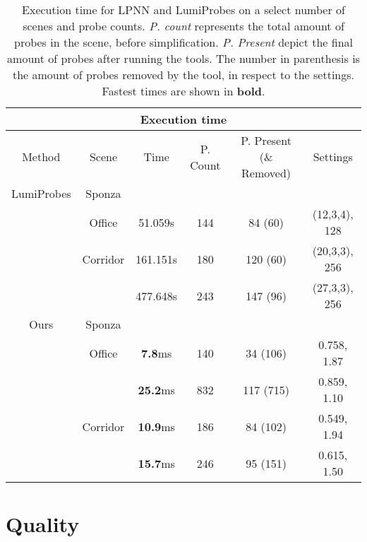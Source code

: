 \begin{table}
	\centering
\begin{tabular}{ |c||c|c|c|c|c|  }
	\hline
	\multicolumn{6}{|c|}{Execution time} \\
	\hline
	Method & Scene & Time & P. Count & P. Present (\& Removed) & Settings\\
	\hline
	LumiProbes & Sponza   &          &     &      &      \\
	\cline{2-6}
	           & Office   & 51.059s  & 144 & 84 (60)  & (12,3,4), 128\\
	\cline{2-6}
	           & Corridor & 161.151s & 180 & 120 (60) & (20,3,3), 256\\
	           &          & 477.648s & 243 & 147 (96) & (27,3,3), 256\\
	\hline
	\hline
	Ours       & Sponza    &       &     &           &             \\
	\cline{2-6}
			   & Office   & \textbf{7.8}ms  & 140 & 34 (106)  &  0.758, 1.87 \\
               &          & \textbf{25.2}ms & 832 & 117 (715) &  0.859, 1.10 \\
    \cline{2-6}
    		   & Corridor & \textbf{10.9}ms & 186 & 84 (102)  & 0.549, 1.94 \\
               &          & \textbf{15.7}ms & 246 & 95 (151)  & 0.615, 1.50 \\
               
	\hline
\end{tabular}
\caption{Execution time for LPNN and LumiProbes on a select number of scenes and probe counts. \textit{P. count} represents the total amount of probes in the scene, before simplification. \textit{P. Present} depict the final amount of probes after running the tools. The number in parenthesis is the amount of probes removed by the tool, in respect to the settings. Fastest times are shown in \textbf{bold}.}
\label{table:times}
\end{table}

\section{Quality}
\label{sec:4_quality}

